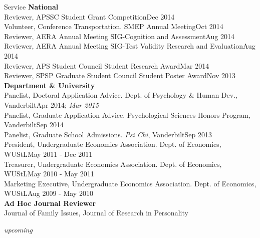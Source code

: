 \documentclass {resume}
\begin{document}
\begin{rSection}{\textrm{Service}}
{\large \textbf{National}}\\
Reviewer, APSSC Student Grant Competition\hfill{Dec 2014}\smallskip\\
Volunteer, Conference Transportation. SMEP Annual Meeting\hfill{Oct 2014}\smallskip\\
Reviewer, AERA Annual Meeting SIG-Cognition and Assessment\hfill{Aug 2014}\smallskip\\%
Reviewer, AERA Annual Meeting SIG-Test Validity Research and Evaluation\hfill{Aug 2014}\smallskip\\
Reviewer, APS Student Council Student Research Award\hfill{Mar 2014}\smallskip\\
Reviewer, SPSP Graduate Student Council Student Poster Award\hfill{Nov 2013}\medskip\\
{\large \textbf{Department \& University}}\\
Panelist, Doctoral Application Advice. Dept. of Psychology \& Human Dev., Vanderbilt\hfill {Apr 2014; \textit{Mar 2015}}\smallskip\\
Panelist, Graduate Application Advice. Psychological Sciences Honors Program, Vanderbilt\hfill {Sep 2014}\smallskip\\
Panelist, Graduate School Admissions. \textit{Psi Chi}, Vanderbilt\hfill {Sep 2013}\smallskip\\
President, Undergraduate Economics Association. Dept. of Economics, WUStL\hfill  {May 2011 - Dec 2011}\smallskip\\
Treasurer, Undergraduate Economics Association. Dept. of Economics, WUStL\hfill{May 2010 - May 2011}\smallskip\\
Marketing Executive, Undergraduate Economics Association. Dept. of Economics, WUStL\hfill  {Aug 2009 - May 2010}\medskip\\
{\large \textbf{Ad Hoc Journal Reviewer}}\\
Journal of Family Issues, %
Journal of Research in Personality%
\\\vspace{-5mm}\begin{center}\footnotesize{ \textit{upcoming}%
}\end{center} \vspace{-2mm}
\end{rSection}
\end{document}
